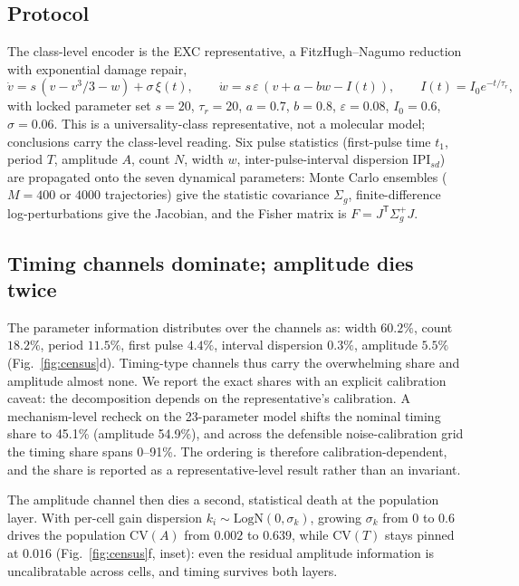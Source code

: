 \documentclass[11pt,a4paper]{article}
\begin{document}
\subsection{Protocol}

The class-level encoder is the EXC representative, a FitzHugh--Nagumo reduction with exponential damage repair,
\begin{equation}
\dot v=s\,(v-v^3/3-w)+\sigma\,\xi(t),
\qquad
\dot w=s\,\varepsilon\,(v+a-bw-I(t)),
\qquad
I(t)=I_0e^{-t/\tau_r},
\label{eq:fhn}
\end{equation}
with locked parameter set $s=20$, $\tau_r=20$, $a=0.7$, $b=0.8$, $\varepsilon=0.08$, $I_0=0.6$, $\sigma=0.06$. This is a universality-class representative, not a molecular model; conclusions carry the class-level reading. Six pulse statistics (first-pulse time $t_1$, period $T$, amplitude $A$, count $N$, width $w$, inter-pulse-interval dispersion $\mathrm{IPI}_{sd}$) are propagated onto the seven dynamical parameters: Monte Carlo ensembles ($M=400$ or $4000$ trajectories) give the statistic covariance $\Sigma_g$, finite-difference log-perturbations give the Jacobian, and the Fisher matrix is $F=J^{\mathsf T}\Sigma_g^{+}J$.

\subsection{Timing channels dominate; amplitude dies twice}

The parameter information distributes over the channels as: width $60.2\%$, count $18.2\%$, period $11.5\%$, first pulse $4.4\%$, interval dispersion $0.3\%$, amplitude $5.5\%$ (Fig.~\ref{fig:census}d). Timing-type channels thus carry the overwhelming share and amplitude almost none. We report the exact shares with an explicit calibration caveat: the decomposition depends on the representative's calibration. A mechanism-level recheck on the 23-parameter model shifts the nominal timing share to 45.1\% (amplitude 54.9\%), and across the defensible noise-calibration grid the timing share spans 0--91\%. The ordering is therefore calibration-dependent, and the share is reported as a representative-level result rather than an invariant.

The amplitude channel then dies a second, statistical death at the population layer. With per-cell gain dispersion $k_i\sim\mathrm{LogN}(0,\sigma_k)$, growing $\sigma_k$ from $0$ to $0.6$ drives the population $\mathrm{CV}(A)$ from $0.002$ to $0.639$, while $\mathrm{CV}(T)$ stays pinned at $0.016$ (Fig.~\ref{fig:census}f, inset): even the residual amplitude information is uncalibratable across cells, and timing survives both layers.
\end{document}
